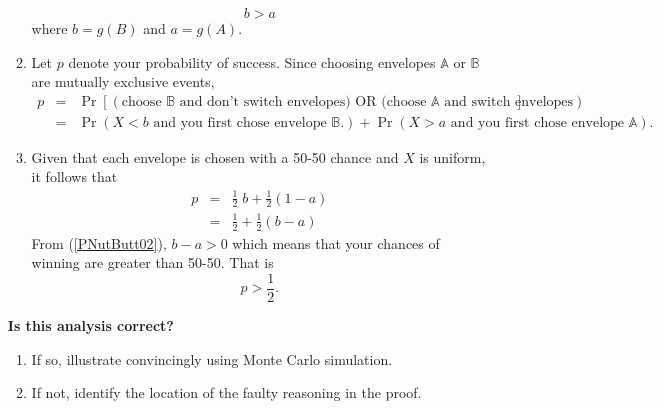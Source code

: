 \documentclass{article}[10pt]
\begin{document}
\begin{enumerate}
\begin{enumerate}
    \begin{equation}
      b>a
      \label{PNutButt02}
    \end{equation}
    where $b=g(B)$ and $a= g(A)$.
  \item Let $p$ denote your probability of success. Since choosing envelopes $\mathbb{A}$ or $\mathbb{B}$ are mutually exclusive events,
    \begin{eqnarray}
      p &=& \Pr \left[ (\mbox{choose } \mathbb{B}\mbox{ and don't switch envelopes) OR (choose } \mathbb{A} \mbox{ and switch envelopes}) \right] \nonumber \\
        &=&  \Pr  \left( X<b \mbox{ and you first chose envelope $\mathbb{B}$.} \right) +
            \Pr \left( X>a \mbox{ and you first chose envelope $\mathbb{A}$} \right). \nonumber
    \end{eqnarray}
  \item Given that each envelope is chosen with a 50-50 chance and $X$ is uniform, it follows that
    \begin{eqnarray}
      p &=& \frac{1}{2} \; b + \frac{1}{2}(1-a)   \nonumber \\
        &=& \frac{1}{2} + \frac{1}{2} (b-a)  \nonumber
    \end{eqnarray}
    From (\ref{PNutButt02}), $b-a>0$ which means that your chances of winning are greater than 50-50. That is
    $$p > \frac{1}{2}.$$
  \end{enumerate}

  {\bf Is this analysis correct?}

  \begin{enumerate}
  \item If so, illustrate convincingly using Monte Carlo simulation.
  \item If not, identify the location of the faulty reasoning in the proof.
  \end{enumerate}
\end{enumerate}
\end{document}
